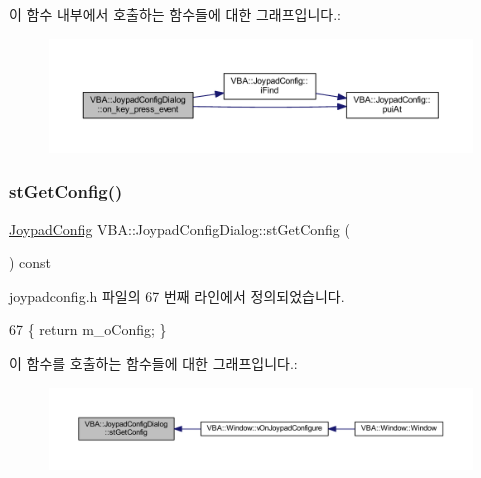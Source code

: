 이 함수 내부에서 호출하는 함수들에 대한 그래프입니다.\+:
\nopagebreak
\begin{figure}[H]
\begin{center}
\leavevmode
\includegraphics[width=350pt]{class_v_b_a_1_1_joypad_config_dialog_afc9f3c90aa8e8f09811c470f97ef3993_cgraph}
\end{center}
\end{figure}
\mbox{\label{class_v_b_a_1_1_joypad_config_dialog_a8b45cad0f50bcd7ec3b422d2e535f645}} 
\subsubsection{\texorpdfstring{st\+Get\+Config()}{stGetConfig()}}
{\footnotesize\ttfamily \mbox{\hyperlink{class_v_b_a_1_1_joypad_config}{Joypad\+Config}} V\+B\+A\+::\+Joypad\+Config\+Dialog\+::st\+Get\+Config (\begin{DoxyParamCaption}{ }\end{DoxyParamCaption}) const\hspace{0.3cm}{\ttfamily [inline]}}



joypadconfig.\+h 파일의 67 번째 라인에서 정의되었습니다.


\begin{DoxyCode}
67 \{ \textcolor{keywordflow}{return} m\_oConfig; \}
\end{DoxyCode}
이 함수를 호출하는 함수들에 대한 그래프입니다.\+:
\nopagebreak
\begin{figure}[H]
\begin{center}
\leavevmode
\includegraphics[width=350pt]{class_v_b_a_1_1_joypad_config_dialog_a8b45cad0f50bcd7ec3b422d2e535f645_icgraph}
\end{center}
\end{figure}
\mbox{\label{class_v_b_a_1_1_joypad_config_dialog_a287e47a32aec963efaa309b8f031268b}} 
